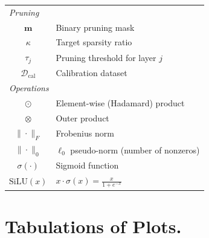 \documentclass{article}
\theoremstyle{plain}
\theoremstyle{definition}
\theoremstyle{remark}
\begin{document}
\begin{table}[h]
\begin{tabular}{cl}
\midrule
\multicolumn{2}{l}{\textit{Pruning}} \\
$\bm{m}$ & Binary pruning mask \\
$\kappa$ & Target sparsity ratio \\
$\tau_j$ & Pruning threshold for layer $j$ \\
$\mathcal{D}_{\text{cal}}$ & Calibration dataset \\
\midrule
\multicolumn{2}{l}{\textit{Operations}} \\
$\odot$ & Element-wise (Hadamard) product \\
$\otimes$ & Outer product \\
$\|\cdot\|_F$ & Frobenius norm \\
$\|\cdot\|_0$ & $\ell_0$ pseudo-norm (number of nonzeros) \\
$\sigma(\cdot)$ & Sigmoid function \\
$\text{SiLU}(x)$ & $x \cdot \sigma(x) = \frac{x}{1+e^{-x}}$ \\
\bottomrule
\end{tabular}
\end{table}

\clearpage

\section{Tabulations of Plots.}
\label{app:plot_tabulations}
\end{document}
